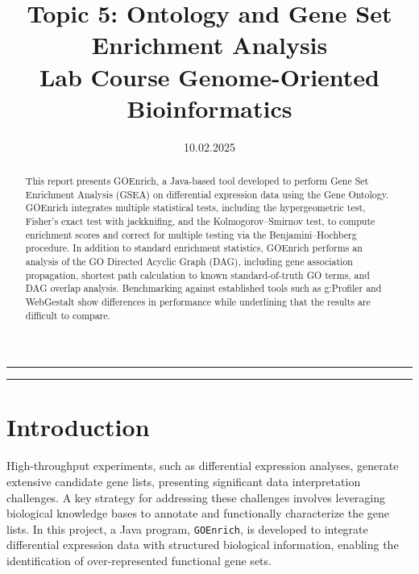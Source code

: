 \documentclass{article}
\title{Topic 5: Ontology and Gene Set Enrichment Analysis\\\large Lab Course Genome-Oriented Bioinformatics}
\author{}
\date{10.02.2025}
\begin{document}
    \maketitle
    \renewcommand{\abstractname}{}
    \begin{abstract}
        \large
        This report presents GOEnrich, a Java-based tool developed to perform Gene Set Enrichment Analysis (GSEA) on differential expression data using the Gene Ontology. GOEnrich integrates multiple statistical tests, including the hypergeometric test, Fisher’s exact test with jackknifing, and the Kolmogorov–Smirnov test, to compute enrichment scores and correct for multiple testing via the Benjamini–Hochberg procedure. In addition to standard enrichment statistics, GOEnrich performs an analysis of the GO Directed Acyclic Graph (DAG), including gene association propagation, shortest path calculation to known standard-of-truth GO terms, and DAG overlap analysis. Benchmarking against established tools such as g:Profiler and WebGestalt show differences in performance while underlining that the results are difficult to compare.
    \end{abstract}
    \hrule
    \tableofcontents
    \vspace{10pt} %
    \hrule

    \pagebreak


    \section{Introduction}\label{sec:introduction}


    High-throughput experiments, such as differential expression analyses, generate extensive candidate gene lists, presenting significant data interpretation challenges. A key strategy for addressing these challenges involves leveraging biological knowledge bases to annotate and functionally characterize the gene lists. In this project, a Java program, \texttt{GOEnrich}, is developed to integrate differential expression data with structured biological information, enabling the identification of over-represented functional gene sets.
\end{document}
